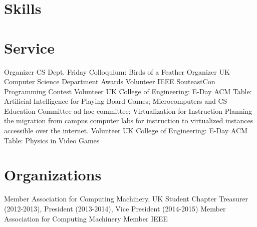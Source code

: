 \documentclass[10pt]{moderncv}
\begin{document}
\section{Skills}

\section{Service}
  {Organizer}
  {CS Dept. Friday Colloquium: Birds of a Feather}
  {}{}{}
  {Organizer}
  {UK Computer Science Department Awards}
  {}{}{}
  {Volunteer}
  {IEEE SouteastCon Programming Contest}
  {}{}{}
  {Volunteer}
  {UK College of Engineering: E-Day}
  {}{}
  {ACM Table: Artificial Intelligence for Playing Board Games; Microcomputers and CS Education}
  {Committee}
  {ad hoc committee: Virtualization for Instruction}
  {}
  {}
  {Planning the migration from campus computer labs for instruction to virtualized instances accessible over the internet.}
  {Volunteer}
  {UK College of Engineering: E-Day}
  {}
  {}
  {ACM Table: Physics in Video Games}

\section{Organizations}
  {Member}
  {Association for Computing Machinery, UK Student Chapter}
  {}
  {}
  {Treasurer (2012-2013), President (2013-2014), Vice President (2014-2015)}
  {Member}
  {Association for Computing Machinery}
  {}{}{}
  {Member}
  {IEEE}
  {}{}{}
\end{document}
